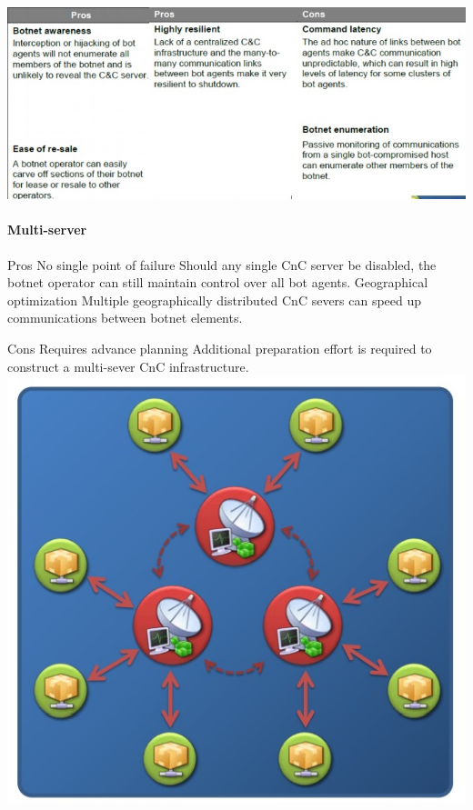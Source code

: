 \includegraphics[scale=1]{img/centralized_topo}

\paragraph{Multi-server}
    Pros 
No single point of failure
Should any single CnC server be disabled, the botnet operator can still maintain control over all bot agents.
Geographical optimization
Multiple geographically distributed CnC severs can speed up communications between botnet elements.

    Cons
Requires advance planning
Additional preparation effort is required to construct a multi-sever CnC infrastructure.\\
\includegraphics[scale=1]{img/multi-server_topo.jpg}

